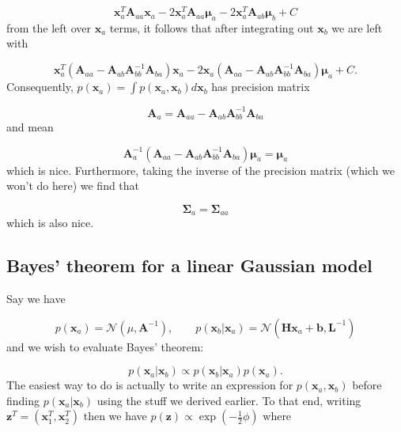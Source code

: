 \documentclass[a4paper, 11pt]{article}
\begin{document}
\begin{equation}
\boldsymbol{x}_a^T \boldsymbol{A}_{aa} \boldsymbol{x}_a - 2\boldsymbol{x}_a^T \boldsymbol{A}_{aa} \boldsymbol{\mu}_a - 2\boldsymbol{x}_a^T \boldsymbol{A}_{ab}\boldsymbol{\mu}_b + C
\end{equation}
from the left over $\boldsymbol{x}_a$ terms, it follows that after integrating out $\boldsymbol{x}_b$ we are left with

\begin{equation}
\boldsymbol{x}_a^T (\boldsymbol{A}_{aa} - \boldsymbol{A}_{ab}\boldsymbol{A}_{bb}^{-1}\boldsymbol{A}_{ba}  )\boldsymbol{x}_a - 2\boldsymbol{x}_a( \boldsymbol{A}_{aa} - \boldsymbol{A}_{ab}\boldsymbol{A}_{bb}^{-1}\boldsymbol{A}_{ba} ) \boldsymbol{\mu}_a + C.
\end{equation}
Consequently, $p(\boldsymbol{x}_a) = \int p(\boldsymbol{x}_a,\boldsymbol{x}_b) d\boldsymbol{x}_b$ has precision matrix

\begin{equation}
\boldsymbol{A}_a = \boldsymbol{A}_{aa} - \boldsymbol{A}_{ab}\boldsymbol{A}_{bb}^{-1} \boldsymbol{A}_{ba}
\end{equation}
and mean

\begin{equation}
\boldsymbol{A}_a^{-1} (  \boldsymbol{A}_{aa} - \boldsymbol{A}_{ab}\boldsymbol{A}_{bb}^{-1} \boldsymbol{A}_{ba} ) \boldsymbol{\mu}_a = \boldsymbol{\mu}_a
\end{equation}
which is nice. Furthermore, taking the inverse of the precision matrix (which we won't do here) we find that

\begin{equation}
\boldsymbol{\Sigma}_a = \boldsymbol{\Sigma}_{aa}
\end{equation}
which is also nice.

\subsection{Bayes' theorem for a linear Gaussian model}
Say we have

\begin{equation}
p(\boldsymbol{x}_a) = \mathcal{N}(\mu,\boldsymbol{A}^{-1}), \qquad p(\boldsymbol{x}_b|\boldsymbol{x}_a) = \mathcal{N}(\boldsymbol{Hx}_a+\boldsymbol{b},\boldsymbol{L}^{-1})
\end{equation}
and we wish to evaluate Bayes' theorem:

\begin{equation}
p(\boldsymbol{x}_a|\boldsymbol{x}_b) \propto p(\boldsymbol{x}_b|\boldsymbol{x}_a)p(\boldsymbol{x}_a).
\end{equation}
The easiest way to do is actually to write an expression for $p(\boldsymbol{x}_a,\boldsymbol{x}_b)$ before finding $p(\boldsymbol{x}_a|\boldsymbol{x}_b)$ using the stuff we derived earlier. To that end, writing $\boldsymbol{z}^T = (\boldsymbol{x}_1^T,\boldsymbol{x}_2^T)$ then we have $p(\boldsymbol{z})\propto \exp(-\frac{1}{2} \phi)$ where
\end{document}

